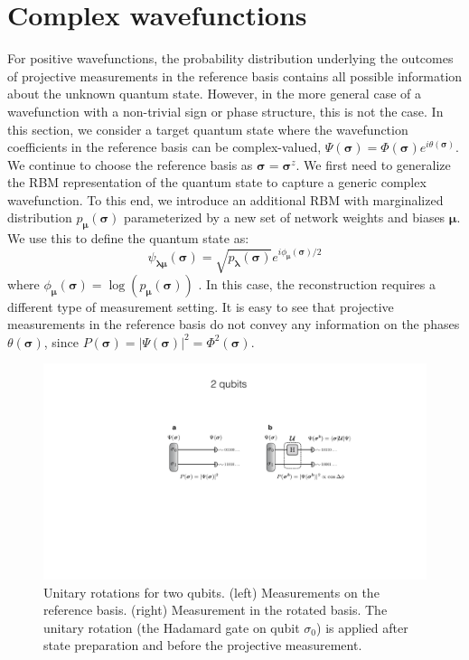 \documentclass[submission, Phys, hidelnks]{SciPost}
\begin{document}
\section{Complex wavefunctions}
\label{sec:complex}
For positive wavefunctions, the probability distribution underlying the outcomes of projective measurements in the reference basis  contains all possible information about the unknown quantum state. 
However, in the more general case of a wavefunction with a non-trivial sign or phase structure, this is not the case.
In this section, we consider a target quantum state where the wavefunction coefficients in the reference basis can be 
complex-valued, $\Psi(\bm{\sigma})=\Phi(\bm{\sigma})e^{i\theta(\bm{\sigma})}$. 
We continue to choose the reference basis as $\bm{\sigma} = \bm{\sigma}^z$.
We first need to generalize the RBM representation of the quantum state to capture a generic complex wavefunction. To this end, we introduce an additional RBM 
with marginalized distribution $p_{\bm{\mu}}(\bm{\sigma})$ parameterized by a new set of network weights and biases $\bm{\mu}$.
We use this to define the quantum state as:
\begin{equation}
    \psi_{\bm{\lambda} \bm{\mu}} (\bm{\sigma})= \sqrt{p_{\bm{\lambda}} (\bm{\sigma})} e^{i \phi_{\bm{\mu}} (\bm{\sigma})/2}
\end{equation}
where $\phi_{\bm{\mu}}(\bm{\sigma}) = \log (p_{\bm{\mu}} (\bm{\sigma}))$ \cite{torlai_neural-network_2018}.
In this case, the reconstruction requires a different type of measurement setting. It is easy to see that projective measurements in the reference basis do not convey any information on the phases $\theta(\bm{\sigma})$, since $P(\bm{\sigma})=|\Psi(\bm{\sigma})|^2=\Phi^2(\bm{\sigma})$.

\begin{figure}[htb]
    \centering
    \includegraphics[width=\columnwidth, trim={0 0 0 40}, clip]{2qubits_rotation}
    \caption{Unitary rotations for two qubits. (left) Measurements on the reference basis. (right) Measurement in the rotated basis. The unitary rotation (the Hadamard gate on qubit $\sigma_0$) is applied after state preparation and before the projective measurement.}
    \label{phase_learn} 
\end{figure}
\end{document}

